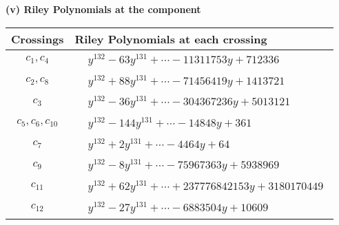 \documentclass[1p]{elsarticle_modified}
\theoremstyle{definition}
\begin{document}
\newpage\renewcommand{\arraystretch}{1}
\flushleft \textbf{(v) Riley Polynomials at the component}\newline \\
\begin{tabular}{m{50pt}|m{274pt}}
Crossings & \hspace{64pt}Riley Polynomials at each crossing \\
\hline $$\begin{aligned}c_{1},c_{4}\end{aligned}$$&$\begin{aligned}
&y^{132}-63 y^{131}+\cdots-11311753 y+712336
\end{aligned}$\\
\hline $$\begin{aligned}c_{2},c_{8}\end{aligned}$$&$\begin{aligned}
&y^{132}+88 y^{131}+\cdots-71456419 y+1413721
\end{aligned}$\\
\hline $$\begin{aligned}c_{3}\end{aligned}$$&$\begin{aligned}
&y^{132}-36 y^{131}+\cdots-304367236 y+5013121
\end{aligned}$\\
\hline $$\begin{aligned}c_{5},c_{6},c_{10}\end{aligned}$$&$\begin{aligned}
&y^{132}-144 y^{131}+\cdots-14848 y+361
\end{aligned}$\\
\hline $$\begin{aligned}c_{7}\end{aligned}$$&$\begin{aligned}
&y^{132}+2 y^{131}+\cdots-4464 y+64
\end{aligned}$\\
\hline $$\begin{aligned}c_{9}\end{aligned}$$&$\begin{aligned}
&y^{132}-8 y^{131}+\cdots-75967363 y+5938969
\end{aligned}$\\
\hline $$\begin{aligned}c_{11}\end{aligned}$$&$\begin{aligned}
&y^{132}+62 y^{131}+\cdots+237776842153 y+3180170449
\end{aligned}$\\
\hline $$\begin{aligned}c_{12}\end{aligned}$$&$\begin{aligned}
&y^{132}-27 y^{131}+\cdots-6883504 y+10609
\end{aligned}$\\
\hline
\end{tabular}\\~\\
\end{document}
